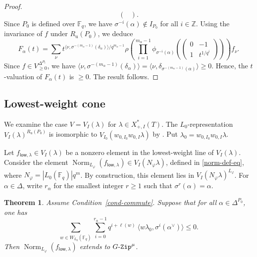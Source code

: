 \documentclass[11pt]{amsart}
\numberwithin{equation}{section}
\newtheorem{theorem}{Theorem}[section]
\theoremstyle{definition}
\theoremstyle{remark}
\newcommand{\GZip}{\mathop{\text{$G$-{\tt Zip}}}\nolimits}
\newcommand{\low}{\mathsf{low}}
\newcommand{\FF}{\mathbb{F}}
\newcommand{\ZZ}{\mathbb{Z}}
\DeclareMathOperator{\Norm}{Norm}
\begin{document}
\begin{proof}
\begin{equation}
\begin{pmatrix}
\end{pmatrix}. 
\end{equation}
Since $P_0$ is defined over $\FF_q$, we have $\sigma^{-i}(\alpha)\notin I_{P_0}$ 
for all $i\in \ZZ$. Using the invariance of $f$ under $R_{\textrm{u}}(P_0)$, we deduce
\begin{equation}
    F_\alpha(t)= \sum_{\nu} t^{\langle \nu,\sigma^{-(m_\alpha-1)}(\delta_\alpha) \rangle / q^{m_\alpha-1} }\rho \left( \prod_{i=1}^{m_{\alpha}-1} \phi_{\sigma^{-i}(\alpha)} 
 \left( \begin{pmatrix}
0&-1\\1&t^{1/q^i}
\end{pmatrix} \right)\right) f_\nu.
\end{equation}
Since $f\in V^{\Delta^{P_1}}_{\geq 0} $, we have $\langle \nu,\sigma^{-(m_\alpha-1)}(\delta_\alpha) \rangle=\langle \nu,\delta_{\sigma^{-(m_\alpha-1)}(\alpha)} \rangle\geq 0$. Hence, the $t$-valuation of $F_\alpha(t)$ is $\geq 0$. The result follows.
\end{proof}


\subsection{Lowest-weight cone}\label{sec-low}

We examine the case $V=V_I(\lambda)$ for $\lambda\in X^*_{+,I}(T)$. The $L_0$-representation $V_I(\lambda)^{R_{\textrm{u}}(P_0)}$ is isomorphic to $V_{I_0}(w_{0,I_0}w_{0,I}\lambda)$ by \cite[Proposition 6.3.1]{Imai-Koskivirta-partial-Hasse}. Put $\lambda_0=w_{0,I_0}w_{0,I}\lambda$. 



Let $f_{\low, \lambda} \in V_I(\lambda)$ be a nonzero element in the lowest-weight line of $V_I(\lambda)$. Consider the element $\Norm_{L_\varphi}(f_{\low, \lambda}) \in V_I(N_\varphi \lambda)$, defined in \eqref{norm-def-eq}, where $N_\varphi=|L_0(\FF_q)|q^m$. By construction, this element lies in $V_I(N_{\varphi}\lambda)^{L_\varphi}$. 
For $\alpha\in \Delta$, write $r_\alpha$ for the smallest integer $r\geq 1$ such that $\sigma^r(\alpha)=\alpha$.

\begin{theorem}\label{thm-norm-low}
Assume Condition~\ref{cond-commute}. Suppose that for all $\alpha \in \Delta^{P_0}$, one has
\begin{equation}\label{formula-norm-low}
\sum_{w\in W_{L_0}(\FF_q)} \sum_{i=0}^{r_\alpha-1} q^{i+\ell(w)} \ \langle w \lambda_0, \sigma^i(\alpha^\vee) \rangle\leq 0.
\end{equation}
Then $\Norm_{L_\varphi}(f_{\low,\lambda})$ extends to $\GZip^\mu$.
\end{theorem}
\end{document}
